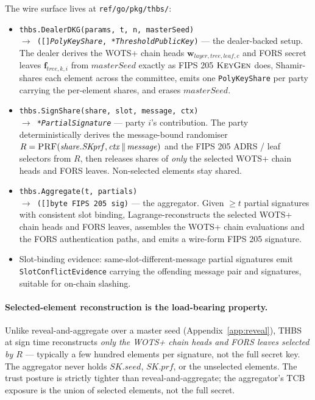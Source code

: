 The wire surface lives at \texttt{ref/go/pkg/thbs/}:
\begin{itemize}[leftmargin=2em,nosep]
  \item \texttt{thbs.DealerDKG(params, t, n, masterSeed) \\
        \(\to\) ([]\textit{PolyKeyShare}, *\textit{ThresholdPublicKey})}
        --- the dealer-backed setup. The dealer derives the WOTS+
        chain heads $\mathbf{w}_{\mathit{layer}, \mathit{tree},
        \mathit{leaf}, c}$ and FORS secret leaves
        $\mathbf{f}_{\mathit{tree}, k, i}$ from
        $\mathit{masterSeed}$ exactly as FIPS 205
        $\textsc{KeyGen}$ does, Shamir-shares each element across
        the committee, emits one \texttt{PolyKeyShare} per party
        carrying the per-element shares, and erases
        $\mathit{masterSeed}$.
  \item \texttt{thbs.SignShare(share, slot, message, ctx) \\
        \(\to\) *\textit{PartialSignature}} --- party $i$'s
        contribution. The party deterministically derives the
        message-bound randomiser $R = \textsc{PRF}(\mathit{share}.
        \mathit{SKprf}, \mathit{ctx} \,\Vert\, \mathit{message})$
        and the FIPS 205 ADRS / leaf selectors from $R$, then
        releases shares of \emph{only} the selected WOTS+ chain
        heads and FORS leaves. Non-selected elements stay shared.
  \item \texttt{thbs.Aggregate(t, partials) \\
        \(\to\) ([]byte FIPS 205 sig)} --- the aggregator. Given
        $\ge t$ partial signatures with consistent slot binding,
        Lagrange-reconstructs the selected WOTS+ chain heads and
        FORS leaves, assembles the WOTS+ chain evaluations and the
        FORS authentication paths, and emits a wire-form FIPS 205
        signature.
  \item Slot-binding evidence: same-slot-different-message
        partial signatures emit
        \texttt{SlotConflictEvidence} carrying the offending
        message pair and signatures, suitable for on-chain
        slashing.
\end{itemize}

\paragraph{Selected-element reconstruction is the load-bearing
property.} Unlike reveal-and-aggregate over a master seed
(Appendix~\ref{app:reveal}), THBS at sign time reconstructs
\emph{only the WOTS+ chain heads and FORS leaves selected by $R$}
--- typically a few hundred elements per signature, not the full
secret key. The aggregator never holds $\mathit{SK.seed}$,
$\mathit{SK.prf}$, or the unselected elements. The trust posture is
strictly tighter than reveal-and-aggregate; the aggregator's TCB
exposure is the union of selected elements, not the full secret.

